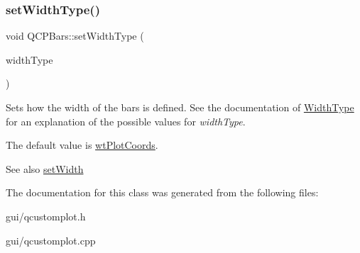 \subsubsection{\texorpdfstring{set\+Width\+Type()}{setWidthType()}}
{\footnotesize\ttfamily void Q\+C\+P\+Bars\+::set\+Width\+Type (\begin{DoxyParamCaption}\item[{\hyperlink{classQCPBars_a65dbbf1ab41cbe993d71521096ed4649}{Q\+C\+P\+Bars\+::\+Width\+Type}}]{width\+Type }\end{DoxyParamCaption})}

Sets how the width of the bars is defined. See the documentation of \hyperlink{classQCPBars_a65dbbf1ab41cbe993d71521096ed4649}{Width\+Type} for an explanation of the possible values for {\itshape width\+Type}.

The default value is \hyperlink{classQCPBars_a65dbbf1ab41cbe993d71521096ed4649aad3cc60ae1bfb1160a30237bee9eaf10}{wt\+Plot\+Coords}.

\begin{DoxySeeAlso}{See also}
\hyperlink{classQCPBars_afec6116579d44d5b706e0fa5e5332507}{set\+Width} 
\end{DoxySeeAlso}


The documentation for this class was generated from the following files\+:\begin{DoxyCompactItemize}
\item 
gui/qcustomplot.\+h\item 
gui/qcustomplot.\+cpp\end{DoxyCompactItemize}
